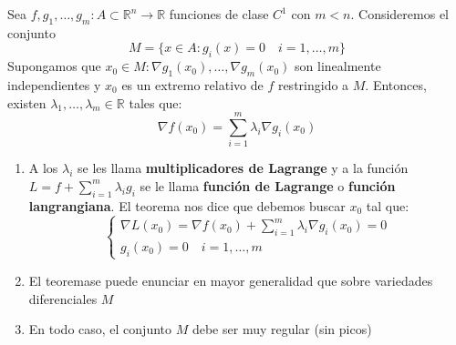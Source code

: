 \begin{teorema}
    Sea $f, g_1, \ldots, g_m: A \subset \mathbb{R}^n \to \mathbb{R}$ funciones de clase $C^1$ con $m < n$. Consideremos el conjunto
    $$M = \{x \in A : g_i(x) = 0 \quad i = 1, \ldots, m\}$$
    Supongamos que $x_0 \in M : \nabla g_1(x_0), \ldots, \nabla g_m(x_0)$ son linealmente independientes y $x_0$ es un extremo relativo de $f$ restringido a $M$. Entonces, existen $\lambda_1, \ldots, \lambda_m \in \mathbb{R}$ tales que:
    $$\nabla f(x_0) = \sum_{i=1}^m \lambda_i \nabla g_i(x_0)$$
\end{teorema}
\begin{observación}
    \begin{enumerate}
        \item A los $\lambda_i$ se les llama \textbf{multiplicadores de Lagrange} y a la función $L = f + \sum_{i=1}^m \lambda_i g_i$ se le llama \textbf{función de Lagrange} o \textbf{función langrangiana}.
        El teorema nos dice que debemos buscar $x_0$ tal que: 
        $$\begin{cases}
            \nabla L(x_0) = \nabla f(x_0) + \sum_{i=1}^m \lambda_i \nabla g_i(x_0) = 0 \\
            g_i(x_0) = 0 \quad i = 1, \ldots, m
        \end{cases}$$
        \item El teoremase puede enunciar en mayor generalidad que sobre variedades diferenciales $M$
        \item En todo caso, el conjunto $M$ debe ser muy regular (sin picos)
    \end{enumerate}
\end{observación}